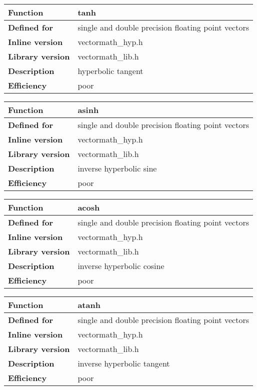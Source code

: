 \documentclass[vcl_manual.tex]{subfiles}
\begin{document}
\begin{tabular}{|p{30mm}|p{120mm}|}
\hline
\bfseries Function & tanh \\ \hline
\bfseries Defined for & single and double precision floating point vectors \\ \hline
\bfseries Inline version & vectormath\_hyp.h \\ \hline
\bfseries Library version & vectormath\_lib.h \\ \hline
\bfseries Description & hyperbolic tangent \\ \hline
\bfseries Efficiency & poor \\ \hline
\end{tabular}


\begin{tabular}{|p{30mm}|p{120mm}|}
\hline
\bfseries Function & asinh \\ \hline
\bfseries Defined for & single and double precision floating point vectors \\ \hline
\bfseries Inline version & vectormath\_hyp.h \\ \hline
\bfseries Library version & vectormath\_lib.h \\ \hline
\bfseries Description & inverse hyperbolic sine \\ \hline
\bfseries Efficiency & poor \\ \hline
\end{tabular}


\begin{tabular}{|p{30mm}|p{120mm}|}
\hline
\bfseries Function & acosh \\ \hline
\bfseries Defined for & single and double precision floating point vectors \\ \hline
\bfseries Inline version & vectormath\_hyp.h \\ \hline
\bfseries Library version & vectormath\_lib.h \\ \hline
\bfseries Description & inverse hyperbolic cosine \\ \hline
\bfseries Efficiency & poor \\ \hline
\end{tabular}


\begin{tabular}{|p{30mm}|p{120mm}|}
\hline
\bfseries Function & atanh \\ \hline
\bfseries Defined for & single and double precision floating point vectors \\ \hline
\bfseries Inline version & vectormath\_hyp.h \\ \hline
\bfseries Library version & vectormath\_lib.h \\ \hline
\bfseries Description & inverse hyperbolic tangent \\ \hline
\bfseries Efficiency & poor \\ \hline
\end{tabular}
\end{document}
